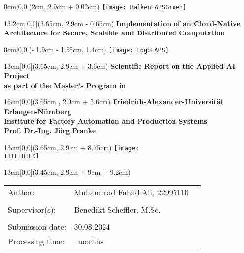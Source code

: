 \newpage
\thispagestyle{empty}




\begin{textblock*}{0cm}[0,0](2cm, 2.9cm + 0.02cm)
	\texttt{[image: BalkenFAPSGruen]}
\end{textblock*}

\begin{textblock*}{13.2cm}[0,0](3.65cm, 2.9cm - 0.65cm)
	\singlespacing
        \Large \bfseries Implementation of an Cloud-Native Architecture for Secure, Scalable and Distributed Computation

\end{textblock*}

\begin{textblock*}{0cm}[0,0](\paperwidth - 1.9cm - 1.55cm, 1.4cm)
	\texttt{[image: LogoFAPS]}
\end{textblock*}

\begin{textblock*}{13cm}[0,0](3.65cm, 2.9cm + 3.6cm)
	\singlespacing
	\bfseries Scientific Report on the Applied AI Project\\ 
	as part of the Master's Program in \STUDIENGANG
\end{textblock*}

\begin{textblock*}{16cm}[0,0](3.65cm , 2.9cm + 5.6cm)
	\singlespacing
	\bfseries
	Friedrich-Alexander-Universität Erlangen-Nürnberg\\
	Institute for Factory Automation and Production Systems\\
	Prof. Dr.-Ing. Jörg Franke
\end{textblock*}

\begin{textblock*}{13cm}[0,0](3.65cm, 2.9cm + 8.75cm)
	\texttt{[image: \\TITELBILD]}
\end{textblock*}

\begin{textblock*}{13cm}[0,0](3.45cm, 2.9cm + 9cm + 9.2cm)
\singlespacing
\begin{table}[h!]
	\begin{tabular}{p{3.5cm}p{7cm}R{4.2cm}}
		Author: 	&	Muhammad Fahad Ali, 22995110\\
		& & \\
		Supervisor(s):		&	Benedikt Scheffler, M.Sc.	& \\ 
		& & \\
		Submission date: 	&	30.08.2024 				& \\
		Processing time:	&	\BEARBEITUNGSZEIT\ months &
	\end{tabular}
\end{table}
\end{textblock*}

\mbox{ }

\newpage
\thispagestyle{empty}



